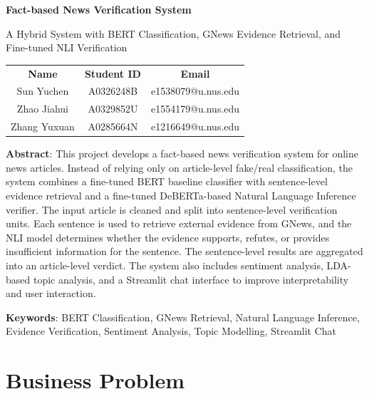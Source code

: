 \documentclass[11pt]{article}
\begin{document}

\begin{center}
    {\LARGE \textbf{Fact-based News Verification System}\par}
    \vspace{0.15em}
    {\Large A Hybrid System with BERT Classification, GNews Evidence Retrieval, and Fine-tuned NLI Verification\par}

    \vspace{0.1in}

    \begin{tabularx}{\textwidth}{@{}CCC@{}}
        \textbf{Name} & \textbf{Student ID} & \textbf{Email} \\
        Sun Yuchen & A0326248B & e1538079@u.nus.edu \\
        Zhao Jiahui & A0329852U & e1554179@u.nus.edu \\
        Zhang Yuxuan & A0285664N & e1216649@u.nus.edu \\
    \end{tabularx}
\end{center}

\noindent\textbf{Abstract}: This project develops a fact-based news verification system for online news articles. Instead of relying only on article-level fake/real classification, the system combines a fine-tuned BERT baseline classifier with sentence-level evidence retrieval and a fine-tuned DeBERTa-based Natural Language Inference verifier. The input article is cleaned and split into sentence-level verification units. Each sentence is used to retrieve external evidence from GNews, and the NLI model determines whether the evidence supports, refutes, or provides insufficient information for the sentence. The sentence-level results are aggregated into an article-level verdict. The system also includes sentiment analysis, LDA-based topic analysis, and a Streamlit chat interface to improve interpretability and user interaction.

\smallskip
\noindent\textbf{Keywords}: BERT Classification, GNews Retrieval, Natural Language Inference, Evidence Verification, Sentiment Analysis, Topic Modelling, Streamlit Chat

\tableofcontents
\newpage
{}

\section{Business Problem}
\end{document}
